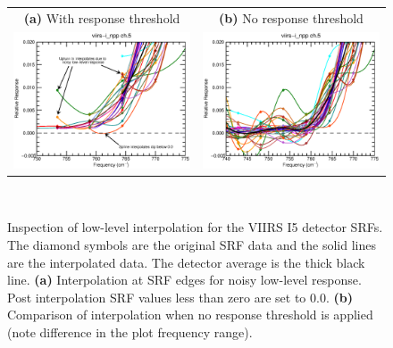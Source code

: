 \begin{figure}[H]
  \centering
  \begin{tabular}{c c}
    \textsf{\textbf{(a)} With response threshold} &
    \textsf{\textbf{(b)} No response threshold} \\
    \includegraphics[bb= 0 15 404 300,clip,scale=0.6]{graphics/viirs-i_npp-ch5_interp1.eps} &
    \includegraphics[bb=19 15 400 300,clip,scale=0.6]{graphics/viirs-i_npp-ch5_interp1-no_threshold.eps} 
  \end{tabular} \\
  \caption{Inspection of low-level interpolation for the VIIRS I5 detector SRFs. The diamond symbols are the original SRF data and the solid lines are the interpolated data. The detector average is the thick black line. \textbf{(a)} Interpolation at SRF edges for noisy low-level response. Post interpolation SRF values less than zero are set to 0.0. \textbf{(b)} Comparison of interpolation when no response threshold is applied (note difference in the plot frequency range).}
  \label{fig:low_level_interp}
\end{figure}

